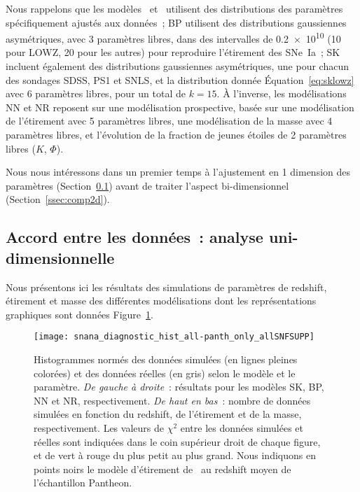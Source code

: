 \documentclass[../main/main.tex]{subfiles}
\begin{document}
Nous rappelons que les modèles~
et~ utilisent des distributions des paramètres
spécifiquement ajustés aux données~; BP utilisent des distributions gaussiennes
asymétriques, avec 3 paramètres libres, dans des intervalles de
\SI{0.2e10}{\Msun} (10 pour LOWZ, 20 pour les autres) pour reproduire
l'étirement des SNe~Ia~; SK incluent également des distributions gaussiennes
asymétriques, une pour chacun des sondages SDSS, PS1 et SNLS, et la distribution
donnée Équation~\ref{eq:sklowz} avec 6 paramètres libres, pour un total de $k =
15$. À l'inverse, les modélisations NN et NR reposent sur une modélisation
prospective, basée sur une modélisation de l'étirement avec 5 paramètres libres,
une modélisation de la masse avec 4 paramètres libres, et l'évolution de la
fraction de jeunes étoiles de 2 paramètres libres ($K$, $\Phi$).

Nous nous intéressons dans un premier temps à l'ajustement en 1 dimension des
paramètres (Section~\ref{ssec:comp1d}) avant de traiter l'aspect bi-dimensionnel
(Section~\ref{ssec:comp2d}).

\subsection{Accord entre les données~: analyse uni-dimensionnelle}\label{ssec:comp1d}

Nous présentons ici les résultats des simulations de paramètres de redshift,
étirement et masse des différentes modélisations dont les représentations
graphiques sont données Figure~\ref{fig:hist1d}.

\begin{figure}[ht]
    \centering
    \texttt{[image: snana\_diagnostic\_hist\_all-panth\_only\_allSNFSUPP]}
    \caption[Histogrammes uni-dimensionnels des données simulées et réelles]
        {Histogrammes normés des données simulées (en lignes pleines
        colorées) et des données réelles (en gris) selon le modèle et le
        paramètre. \textit{De gauche à droite}~: résultats pour les modèles SK,
        BP, NN et NR, respectivement. \textit{De haut en bas}~: nombre de
        données simulées en fonction du redshift, de l'étirement et de la masse,
        respectivement. Les valeurs de $\chi^2$ entre les données simulées et
        réelles sont indiquées dans le coin supérieur droit de chaque figure, et
        de vert à rouge du plus petit au plus grand. Nous indiquons en points
        noirs le modèle d'étirement de~ au redshift
        moyen de l'échantillon Pantheon.}
    \label{fig:hist1d}
\end{figure}
\end{document}
